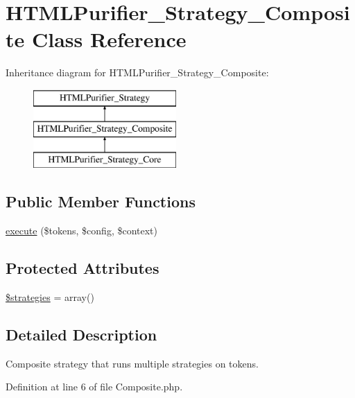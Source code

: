 \hypertarget{classHTMLPurifier__Strategy__Composite}{\section{H\+T\+M\+L\+Purifier\+\_\+\+Strategy\+\_\+\+Composite Class Reference}
\label{classHTMLPurifier__Strategy__Composite}
}
Inheritance diagram for H\+T\+M\+L\+Purifier\+\_\+\+Strategy\+\_\+\+Composite\+:\begin{figure}[H]
\begin{center}
\leavevmode
\includegraphics[height=3.000000cm]{classHTMLPurifier__Strategy__Composite}
\end{center}
\end{figure}
\subsection*{Public Member Functions}
\begin{DoxyCompactItemize}
\item 
\hyperlink{classHTMLPurifier__Strategy__Composite_afcfcfec4e5de2d1cc7f78a57bdd5be87}{execute} (\$tokens, \$config, \$context)
\end{DoxyCompactItemize}
\subsection*{Protected Attributes}
\begin{DoxyCompactItemize}
\item 
\hyperlink{classHTMLPurifier__Strategy__Composite_a5b643fc2bf293843b95c6829de63855f}{\$strategies} = array()
\end{DoxyCompactItemize}


\subsection{Detailed Description}
Composite strategy that runs multiple strategies on tokens. 

Definition at line 6 of file Composite.\+php.



